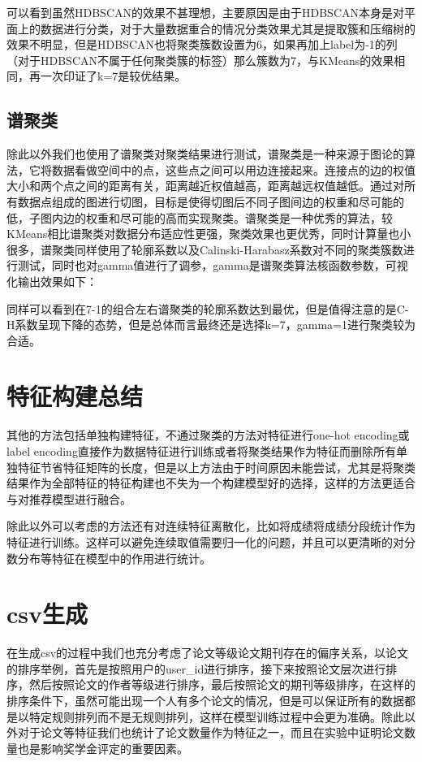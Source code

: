 可以看到虽然HDBSCAN的效果不甚理想，主要原因是由于HDBSCAN本身是对平面上的数据进行分类，对于大量数据重合的情况分类效果尤其是提取簇和压缩树的效果不明显，但是HDBSCAN也将聚类簇数设置为6，如果再加上label为-1的列（对于HDBSCAN不属于任何聚类簇的标签）那么簇数为7，与KMeans的效果相同，再一次印证了k=7是较优结果。

\subsection{谱聚类}

除此以外我们也使用了谱聚类对聚类结果进行测试，谱聚类是一种来源于图论的算法，它将数据看做空间中的点，这些点之间可以用边连接起来。连接点的边的权值大小和两个点之间的距离有关，距离越近权值越高，距离越远权值越低。通过对所有数据点组成的图进行切图，目标是使得切图后不同子图间边的权重和尽可能的低，子图内边的权重和尽可能的高而实现聚类。谱聚类是一种优秀的算法，较KMeans相比谱聚类对数据分布适应性更强，聚类效果也更优秀，同时计算量也小很多，谱聚类同样使用了轮廓系数以及Calinski-Harabasz系数对不同的聚类簇数进行测试，同时也对gamma值进行了调参，gamma是谱聚类算法核函数参数，可视化输出效果如下：



同样可以看到在7-1的组合左右谱聚类的轮廓系数达到最优，但是值得注意的是C-H系数呈现下降的态势，但是总体而言最终还是选择k=7，gamma=1进行聚类较为合适。

\section{特征构建总结}

其他的方法包括单独构建特征，不通过聚类的方法对特征进行one-hot encoding或label encoding直接作为数据特征进行训练或者将聚类结果作为特征而删除所有单独特征节省特征矩阵的长度，但是以上方法由于时间原因未能尝试，尤其是将聚类结果作为全部特征的特征构建也不失为一个构建模型好的选择，这样的方法更适合与对推荐模型进行融合。

除此以外可以考虑的方法还有对连续特征离散化，比如将成绩将成绩分段统计作为特征进行训练。这样可以避免连续取值需要归一化的问题，并且可以更清晰的对分数分布等特征在模型中的作用进行统计。

\section{csv生成}

在生成csv的过程中我们也充分考虑了论文等级论文期刊存在的偏序关系，以论文的排序举例，首先是按照用户的user\_id进行排序，接下来按照论文层次进行排序，然后按照论文的作者等级进行排序，最后按照论文的期刊等级排序，在这样的排序条件下，虽然可能出现一个人有多个论文的情况，但是可以保证所有的数据都是以特定规则排列而不是无规则排列，这样在模型训练过程中会更为准确。除此以外对于论文等特征我们也统计了论文数量作为特征之一，而且在实验中证明论文数量也是影响奖学金评定的重要因素。

